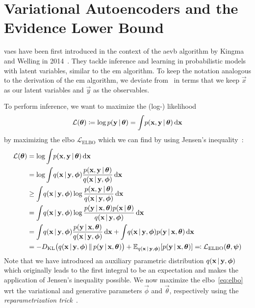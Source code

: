 \section{Variational Autoencoders and the Evidence Lower Bound}
	\acp{vae} have been first introduced in the context of the \ac{aevb} algorithm by Kingma and Welling in 2014~\cite{kingmaAutoEncodingVariationalBayes2014}. They tackle inference and learning in probabilistic models with latent variables, similar to the \ac{em} algorithm. To keep the notation analogous to the derivation of the \ac{em} algorithm, we deviate from~\cite{kingmaAutoEncodingVariationalBayes2014} in terms that we keep \(\vec{x}\) as our latent variables and \(\vec{y}\) as the observables.

	To perform inference, we want to maximize the (log-) likelihood
	\begin{align*}
		\mathcal{L}(\vec{\theta}) \coloneqq \log p(\vec{y} \given \vec{\theta}) = \int\! p(\vec{x}, \vec{y} \given \vec{\theta}) \dd{\vec{x}}
	\end{align*}
	by maximizing the \ac{elbo} \( \mathcal{L}_\mathrm{ELBO} \) which we can find by using Jensen's inequality~\cite{jensenFonctionsConvexesInegalites1906}:
	\begin{align}
		\mathcal{L}(\vec{\theta})
			&= \log \int\! p(\vec{x}, \vec{y} \given \vec{\theta}) \dd{\vec{x}}  \nonumber \\
			&= \log \int\! q(\vec{x} \given \vec{y}, \vec{\phi}) \frac{p(\vec{x}, \vec{y} \given \vec{\theta})}{q(\vec{x} \given \vec{y}, \vec{\phi})} \dd{\vec{x}}  \nonumber \\
			&\geq \int\! q(\vec{x} \given \vec{y}, \vec{\phi}) \log \frac{p(\vec{x}, \vec{y} \given \vec{\theta})}{q(\vec{x} \given \vec{y}, \vec{\phi})} \dd{\vec{x}}  \nonumber \\
			&= \int\! q(\vec{x} \given \vec{y}, \vec{\phi}) \log \frac{p(\vec{y} \given \vec{x}, \vec{\theta}) p(\vec{x} \given \vec{\theta})}{q(\vec{x} \given \vec{y}, \vec{\phi})} \dd{\vec{x}}  \nonumber \\
			&= \int\! q(\vec{x} \given \vec{y}, \vec{\phi}) \frac{p(\vec{y} \given \vec{x}, \vec{\theta})}{q(\vec{x} \given \vec{y}, \vec{\phi})} \dd{\vec{x}} + \int\! q(\vec{x} \given \vec{y}, \vec{\phi}) p(\vec{y} \given \vec{x}, \vec{\theta}) \dd{\vec{x}}  \nonumber \\
			&= -\KL{q(\vec{x} \given \vec{y}, \vec{\phi})}{p(\vec{y} \given \vec{x}, \vec{\theta})} + \E_{q(\vec{x} \given \vec{y}, \vec{\phi})}[p(\vec{y} \given \vec{x}, \vec{\theta})] \eqqcolon \mathcal{L}_\mathrm{ELBO}(\vec{\theta}, \vec{\psi})  \label{eq:elbo}
	\end{align}
	Note that we have introduced an auxiliary parametric distribution \( q(\vec{x} \given \vec{y}, \vec{\phi}) \) which originally leads to the first integral to be an expectation and makes the application of Jensen's inequality possible. We now maximize the \ac{elbo}~\eqref{eq:elbo} \ac{wrt} the variational and generative parameters \(\vec{\phi}\) and \(\vec{\theta}\), respectively using the \emph{reparametrization trick}~\cite{kingmaAutoEncodingVariationalBayes2014}.

